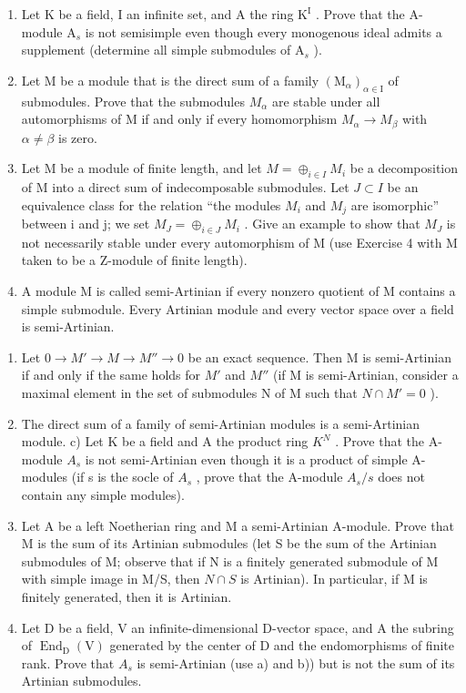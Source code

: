 \begin{enumerate}
\def\labelenumi{\arabic{enumi})}
\setcounter{enumi}{2}
\item
  Let \(\mathrm{K}\) be a field, I an infinite set, and A the ring \(\mathrm{K}^{\mathrm{I}}\) . Prove that the A-module \(\mathrm{A}_s\) is not semisimple even though every monogenous ideal admits a supplement (determine all simple submodules of \(\mathrm{A}_s\) ).
\item
  Let M be a module that is the direct sum of a family \((\mathrm{M}_{\alpha})_{\alpha\in\mathrm{I}}\) of submodules. Prove that the submodules \(M_{\alpha}\) are stable under all automorphisms of M if and only if every homomorphism \(M_{\alpha}\to M_{\beta}\) with \(\alpha\neq\beta\) is zero.
\item
  Let M be a module of finite length, and let \(M = \oplus_{i \in I} M_i\) be a decomposition of M into a direct sum of indecomposable submodules. Let \(J \subset I\) be an equivalence class for the relation ``the modules \(M_i\) and \(M_j\) are isomorphic'' between i and j; we set \(M_J = \oplus_{i \in J} M_i\) . Give an example to show that \(M_J\) is not necessarily stable under every automorphism of M (use Exercise 4 with M taken to be a Z-module of finite length).
\item
  A module M is called semi-Artinian if every nonzero quotient of M contains a simple submodule. Every Artinian module and every vector space over a field is semi-Artinian.
\end{enumerate}

\begin{enumerate}
\def\labelenumi{\alph{enumi})}
\item
  Let \(0 \rightarrow M' \rightarrow M \rightarrow M'' \rightarrow 0\) be an exact sequence. Then M is semi-Artinian if and only if the same holds for \(M'\) and \(M''\) (if M is semi-Artinian, consider a maximal element in the set of submodules N of M such that \(N \cap M' = 0\) ).
\item
  The direct sum of a family of semi-Artinian modules is a semi-Artinian module. c) Let K be a field and A the product ring \(K^{N}\) . Prove that the A-module \(A_{s}\) is not semi-Artinian even though it is a product of simple A-modules (if s is the socle of \(A_{s}\) , prove that the A-module \(A_{s}/s\) does not contain any simple modules).
\item
  Let A be a left Noetherian ring and M a semi-Artinian A-module. Prove that M is the sum of its Artinian submodules (let S be the sum of the Artinian submodules of M; observe that if N is a finitely generated submodule of M with simple image in M/S, then \(N \cap S\) is Artinian). In particular, if M is finitely generated, then it is Artinian.
\item
  Let D be a field, V an infinite-dimensional D-vector space, and A the subring of \(\operatorname{End}_{\mathrm{D}}(\mathrm{V})\) generated by the center of D and the endomorphisms of finite rank. Prove that \(A_{s}\) is semi-Artinian (use a) and b)) but is not the sum of its Artinian submodules.
\end{enumerate}

